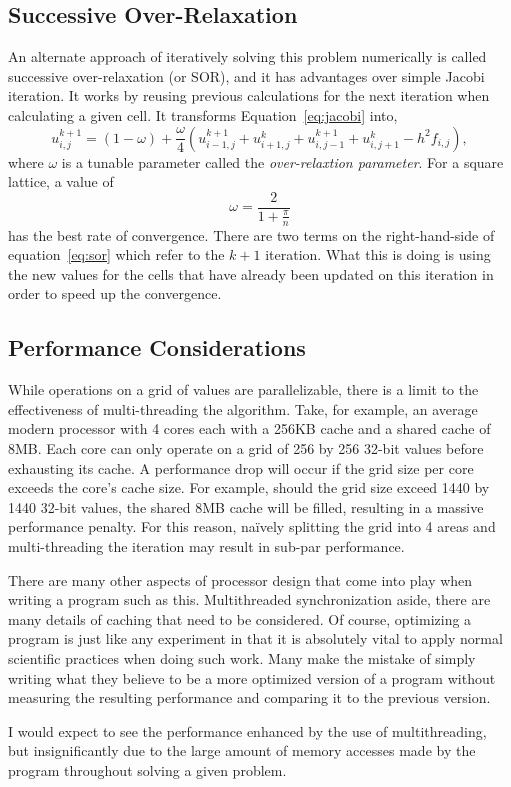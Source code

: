 \subsection{Successive Over-Relaxation}

An alternate approach of iteratively solving this problem numerically is called successive over-relaxation (or SOR), and
it has advantages over simple Jacobi iteration. It works by reusing previous calculations for the next iteration when
calculating a given cell. It transforms Equation~\ref{eq:jacobi} into,
\begin{equation} \label{eq:sor}
u_{i,j}^{k+1} = (1-\omega) + \frac{\omega}{4}\left(u_{i-1,j}^{k+1} + u_{i+1,j}^{k} + u_{i,j-1}^{k+1} + u_{i,j+1}^{k} - h^2 f_{i,j}\right),
\end{equation}
where $\omega$ is a tunable parameter called the \textit{over-relaxtion parameter}. For a square lattice, a value of
$$\omega = \frac{2}{1+\frac{\pi}{n}}$$
has the best rate of convergence\cite{poisson-relax}. There are two terms on the right-hand-side of equation~\ref{eq:sor} which refer to the
$k+1$ iteration. What this is doing is using the new values for the cells that have already been updated on this iteration
in order to speed up the convergence.













\subsection{Performance Considerations}
While operations on a grid of values are parallelizable, there is a limit to
the effectiveness of multi-threading the algorithm. Take, for example, an average
modern processor with 4 cores each with a 256KB cache and a shared cache of 8MB\@. Each core
can only operate on a grid of 256 by 256 32-bit values before exhausting its cache.
A performance drop will occur if the grid size per core exceeds the core's cache
size. For example, should the grid size exceed 1440 by 1440 32-bit values,
the shared 8MB cache will
be filled, resulting in a massive performance penalty. For this reason, na\"{i}vely splitting
the grid into 4 areas and multi-threading the iteration may result in sub-par performance.

There are many other aspects of processor design that come into play when writing a program
such as this. Multithreaded synchronization aside, there are many details of caching that
need to be considered. Of course, optimizing a program is just like any experiment in that
it is absolutely vital to apply normal scientific practices when doing such work. Many make
the mistake of simply writing what they believe to be a more optimized version of a program
without measuring the resulting performance and comparing it to the previous version.

I would expect to see the performance enhanced by the use of multithreading, but insignificantly
due to the large amount of memory accesses made by the program throughout solving a given problem.

